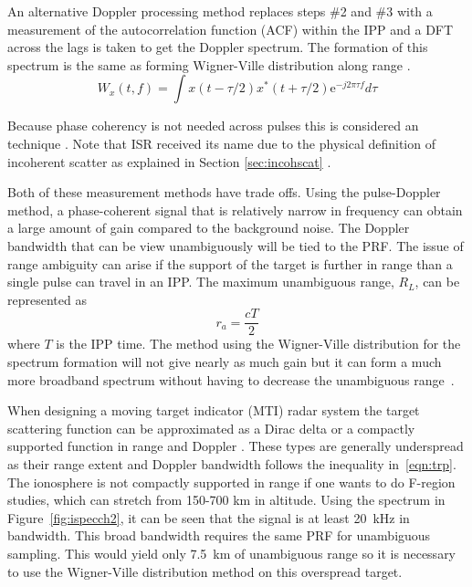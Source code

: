 An alternative Doppler processing method replaces steps \#2 and \#3 with a measurement of the autocorrelation function (ACF) within the IPP and a DFT across the lags is taken to get the Doppler spectrum.
The formation of this spectrum is the same as forming Wigner-Ville distribution along range \cite{TFAcohen}.
\begin{equation}
\label{eqn:wigdist}
W_x(t,f)=\int x(t-\tau/2)x^*(t+\tau/2)\text{e}^{-j2\pi \tau f}d\tau
\end{equation}

Because phase coherency is not needed across pulses this is considered an  technique \cite{richards2014fundamentals,richards2010principles,richards2014principles,skolnik2008radar}. 
Note that ISR received its name due to the physical definition of incoherent scatter as explained in Section \ref{sec:incohscat} \cite{gordon58,dougherty:farley1960}.

Both of these measurement methods have trade offs. Using the pulse-Doppler method, a phase-coherent signal that is relatively narrow in frequency can obtain a large amount of gain compared to the background noise. The Doppler bandwidth that can be view unambiguously will be tied to the PRF. The issue of range ambiguity can arise if the support of the target is further in range than a single pulse can travel in an IPP. The maximum unambiguous range, $R_L$, can be represented as 
\begin{equation}
\label{eqn:maxuar}
r_a =  \frac{cT}{2}
\end{equation}
where $T$ is the IPP time. 
The method using the Wigner-Ville distribution for the spectrum formation will not give nearly as much gain but it can form a much more broadband spectrum without having to decrease the unambiguous range~\cite{richards2014fundamentals}.

When designing a moving target indicator (MTI) radar system the target scattering function can be approximated as a Dirac delta or a compactly supported function in range and Doppler \cite{richards2014fundamentals}. 
These types are generally underspread as their range extent and Doppler bandwidth follows the inequality in~\eqref{eqn:trp}. 
The ionosphere is not compactly supported in range if one wants to do F-region studies, which can stretch from 150-700 km in altitude. 
Using the spectrum in Figure~\ref{fig:ispecch2}, it can be seen that the signal is at least 20~kHz in bandwidth.
This broad bandwidth requires the same PRF for unambiguous sampling. 
This would yield only 7.5~km of unambiguous range so it is necessary to use the Wigner-Ville distribution method on this overspread target. 


